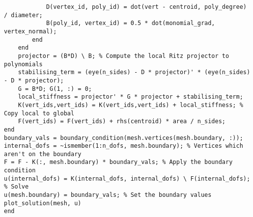 \documentclass{article}
\begin{document}
\begin{verbatim}
			D(vertex_id, poly_id) = dot(vert - centroid, poly_degree) / diameter;
			B(poly_id, vertex_id) = 0.5 * dot(monomial_grad, vertex_normal);
		end
	end
	projector = (B*D) \ B; % Compute the local Ritz projector to polynomials
	stabilising_term = (eye(n_sides) - D * projector)' * (eye(n_sides) - D * projector);
	G = B*D; G(1, :) = 0;
	local_stiffness = projector' * G * projector + stabilising_term;
	K(vert_ids,vert_ids) = K(vert_ids,vert_ids) + local_stiffness; % Copy local to global
	F(vert_ids) = F(vert_ids) + rhs(centroid) * area / n_sides;
end
boundary_vals = boundary_condition(mesh.vertices(mesh.boundary, :));
internal_dofs = ~ismember(1:n_dofs, mesh.boundary); % Vertices which aren't on the boundary
F = F - K(:, mesh.boundary) * boundary_vals; % Apply the boundary condition
u(internal_dofs) = K(internal_dofs, internal_dofs) \ F(internal_dofs); % Solve
u(mesh.boundary) = boundary_vals; % Set the boundary values
plot_solution(mesh, u)
end
\end{verbatim}
\end{document}

